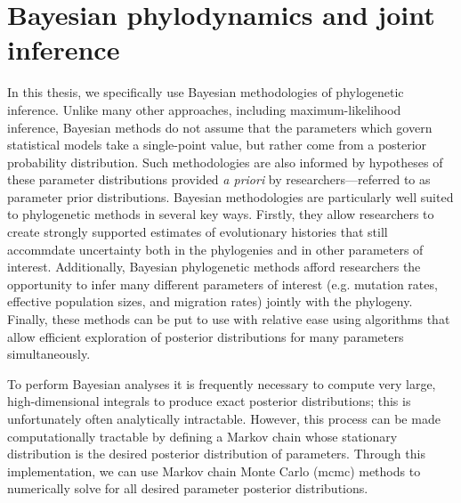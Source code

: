 \section{Bayesian phylodynamics and joint inference}

In this thesis, we specifically use Bayesian methodologies of phylogenetic inference.
Unlike many other approaches, including maximum-likelihood inference, Bayesian methods do not assume that the parameters which govern statistical models take a single-point value, but rather come from a posterior probability distribution.
Such methodologies are also informed by hypotheses of these parameter distributions provided \textit{a priori} by researchers---referred to as parameter prior distributions.
Bayesian methodologies are particularly well suited to phylogenetic methods in several key ways.
Firstly, they allow researchers to create strongly supported estimates of evolutionary histories that still accommdate uncertainty both in the phylogenies and in other parameters of interest.
Additionally, Bayesian phylogenetic methods afford researchers the opportunity to infer many different parameters of interest (e.g. mutation rates, effective population sizes, and migration rates) jointly with the phylogeny.
Finally, these methods can be put to use with relative ease using algorithms that allow efficient exploration of posterior distributions for many parameters simultaneously. %

To perform Bayesian analyses it is frequently necessary to compute very large, high-dimensional integrals to produce exact posterior distributions; this is unfortunately often analytically intractable.
However, this process can be made computationally tractable by defining a Markov chain whose stationary distribution is the desired posterior distribution of parameters.
Through this implementation, we can use Markov chain Monte Carlo (\gls{mcmc}) methods to numerically solve for all desired parameter posterior distributions.

